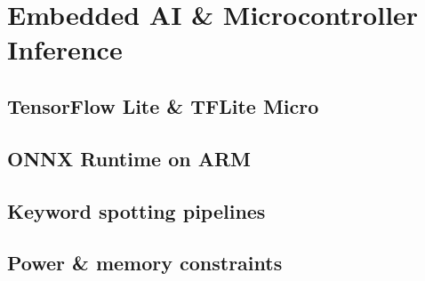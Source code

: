 
\section{Embedded AI \& Microcontroller Inference}

\subsection{TensorFlow Lite \& TFLite Micro}


\subsection{ONNX Runtime on ARM}


\subsection{Keyword spotting pipelines}


\subsection{Power \& memory constraints}


